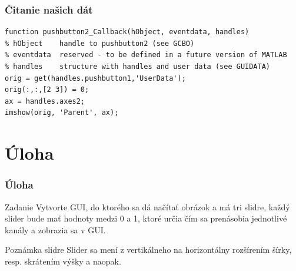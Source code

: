 \documentclass{beamer}
\begin{document}
\begin{frame}[fragile]
  \frametitle{Čitanie našich dát}
  \begin{verbatim}
function pushbutton2_Callback(hObject, eventdata, handles)
% hObject    handle to pushbutton2 (see GCBO)
% eventdata  reserved - to be defined in a future version of MATLAB
% handles    structure with handles and user data (see GUIDATA)
orig = get(handles.pushbutton1,'UserData');
orig(:,:,[2 3]) = 0;
ax = handles.axes2;
imshow(orig, 'Parent', ax); \end{verbatim}
\end{frame}

\section{Úloha}

\begin{frame}
  \frametitle{Úloha}
  \begin{block}{Zadanie}
    Vytvorte GUI, do ktorého sa dá načítať obrázok a má tri slidre, každý slider bude mať hodnoty medzi 0 a 1, ktoré určia čím sa prenásobia jednotlivé kanály a zobrazia sa v GUI.
  \end{block}
  
  \begin{block}{Poznámka slidre}
    Slider sa mení z vertikálneho na horizontálny rozšírením šírky, resp. skrátením výšky a naopak.
  \end{block}
  
\end{frame}

 
\end{document}
